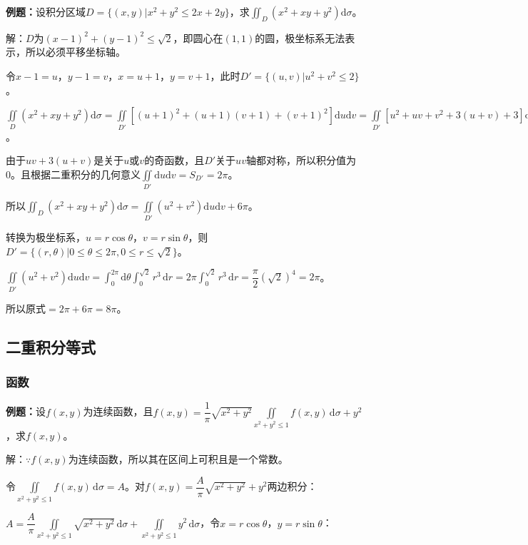 \documentclass[UTF8, 12pt]{ctexart}
\begin{document}
\textbf{例题：}设积分区域$D=\{(x,y)\vert x^2+y^2\leqslant2x+2y\}$，求$\iint_D(x^2+xy+y^2)\textrm{d}\sigma$。

解：$D$为$(x-1)^2+(y-1)^2\leqslant\sqrt{2}$，即圆心在$(1,1)$的圆，极坐标系无法表示，所以必须平移坐标轴。

令$x-1=u$，$y-1=v$，$x=u+1$，$y=v+1$，此时$D'=\{(u,v)|u^2+v^2\leqslant2\}$。

$\iint\limits_D(x^2+xy+y^2)\textrm{d}\sigma=\iint\limits_{D'}[(u+1)^2+(u+1)(v+1)+(v+1)^2]\textrm{d}u\textrm{d}v=\iint\limits_{D'}[u^2+uv+v^2+3(u+v)+3]\textrm{d}u\textrm{d}v=\iint\limits_{D'}(u^2+v^2)\textrm{d}u\textrm{d}v+\iint\limits_{D'}[uv+3(u+v)]\textrm{d}u\textrm{d}v+3\iint_{D'}\textrm{d}u\textrm{d}v$。

由于$uv+3(u+v)$是关于$u$或$v$的奇函数，且$D'$关于$uv$轴都对称，所以积分值为0。且根据二重积分的几何意义$\iint\limits_{D'}\textrm{d}u\textrm{d}v=S_{D'}=2\pi$。

所以$\iint_D(x^2+xy+y^2)\textrm{d}\sigma=\iint\limits_{D'}(u^2+v^2)\textrm{d}u\textrm{d}v+6\pi$。

转换为极坐标系，$u=r\cos\theta$，$v=r\sin\theta$，则$D'=\{(r,\theta)|0\leqslant\theta\leqslant2\pi,0\leqslant r\leqslant\sqrt{2}\}$。

$\iint\limits_{D'}(u^2+v^2)\textrm{d}u\textrm{d}v=\int_0^{2\pi}\textrm{d}\theta\int_0^{\sqrt{2}}r^3\,\textrm{d}r=2\pi\int_0^{\sqrt{2}}r^3\,\textrm{d}r=\dfrac{\pi}{2}(\sqrt{2})^4=2\pi$。

所以原式$=2\pi+6\pi=8\pi$。

\subsection{二重积分等式}

\subsubsection{函数}

\textbf{例题：}设$f(x,y)$为连续函数，且$f(x,y)=\dfrac{1}{\pi}\sqrt{x^2+y^2}\iint\limits_{x^2+y^2\leqslant1}f(x,y)\,\textrm{d}\sigma+y^2$，求$f(x,y)$。

解：$\because f(x,y)$为连续函数，所以其在区间上可积且是一个常数。

令$\iint\limits_{x^2+y^2\leqslant1}f(x,y)\,\textrm{d}\sigma=A$。对$f(x,y)=\dfrac{A}{\pi}\sqrt{x^2+y^2}+y^2$两边积分：

$A=\dfrac{A}{\pi}\iint\limits_{x^2+y^2\leqslant1}\sqrt{x^2+y^2}\,\textrm{d}\sigma+\iint\limits_{x^2+y^2\leqslant1}y^2\,\textrm{d}\sigma$，令$x=r\cos\theta$，$y=r\sin\theta$：
\end{document}
